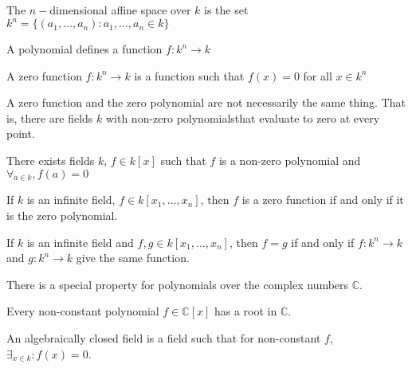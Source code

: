 \documentclass[crop=false,class=article,oneside]{standalone}
\begin{document}
            \begin{definition}
                The $n-$dimensional affine space over
                $k$ is the set
                $k^{n}%
                 =\{(a_1,\hdots,a_n):a_1,\hdots,a_n \in k\}$
            \end{definition}
            \begin{remark}
                A polynomial defines a function
                $f:k^{n}\rightarrow{k}$
            \end{remark}
            \begin{definition}
                A zero function $f:k^{n}\rightarrow{k}$
                is a function such that $f(x)=0$
                for all $x\in{k^{n}}$
            \end{definition}
            \begin{remark}
                A zero function and the zero polynomial are
                not necessarily the same thing. That is,
                there are fields $k$ with non-zero
                polynomialsthat evaluate to
                zero at every point.
            \end{remark}
            \begin{theorem}
                There exists fields $k$, $f\in k[x]$ such
                that $f$ is a non-zero polynomial and
                $\forall_{a\in k},f(a)=0$
            \end{theorem}
            \begin{theorem}
                If $k$ is an infinite field,
                $f\in k[x_1,\hdots ,x_n]$, then $f$ is a
                zero function if and only if it is
                the zero polynomial.
            \end{theorem}
            \begin{theorem}
                If $k$ is an infinite field and
                $f,g\in k[x_1,\hdots,x_n]$, then $f=g$ if and
                only if $f:k^n\rightarrow k$ and
                $g:k^n \rightarrow k$ give
                the same function.
            \end{theorem}
            There is a special property for polynomials
            over the complex numbers $\mathbb{C}$.
            \begin{theorem}
                Every non-constant polynomial
                $f\in\mathbb{C}[x]$ has a root in $\mathbb{C}$.
            \end{theorem}
            \begin{definition}
                An algebraically closed field is a field
                such that for non-constant $f$,
                $\exists_{x\in k}:f(x)=0$.
            \end{definition}
\end{document}
